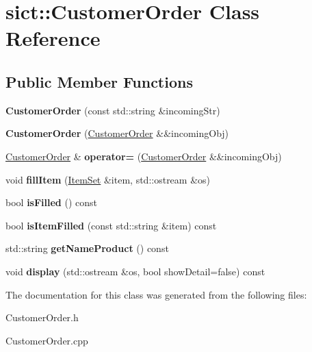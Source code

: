 \hypertarget{classsict_1_1CustomerOrder}{}\section{sict\+::Customer\+Order Class Reference}
\label{classsict_1_1CustomerOrder}
\subsection*{Public Member Functions}
\begin{DoxyCompactItemize}
\item 
\mbox{\label{classsict_1_1CustomerOrder_a99059f4ad8017fc50cd7415399c19590}} 
{\bfseries Customer\+Order} (const std\+::string \&incoming\+Str)
\item 
\mbox{\label{classsict_1_1CustomerOrder_aec3ddf69effe4f1a0a3fceff70f15c68}} 
{\bfseries Customer\+Order} (\mbox{\hyperlink{classsict_1_1CustomerOrder}{Customer\+Order}} \&\&incoming\+Obj)
\item 
\mbox{\label{classsict_1_1CustomerOrder_a1502e66899c28b565610e8516985a27b}} 
\mbox{\hyperlink{classsict_1_1CustomerOrder}{Customer\+Order}} \& {\bfseries operator=} (\mbox{\hyperlink{classsict_1_1CustomerOrder}{Customer\+Order}} \&\&incoming\+Obj)
\item 
\mbox{\label{classsict_1_1CustomerOrder_a08ec1a2acdd124da489e2e9177349ffb}} 
void {\bfseries fill\+Item} (\mbox{\hyperlink{classsict_1_1ItemSet}{Item\+Set}} \&item, std\+::ostream \&os)
\item 
\mbox{\label{classsict_1_1CustomerOrder_a70160bacde7481aaeb51d1455429199f}} 
bool {\bfseries is\+Filled} () const
\item 
\mbox{\label{classsict_1_1CustomerOrder_a1f8f4fab0abe3139267fe75b1265f99d}} 
bool {\bfseries is\+Item\+Filled} (const std\+::string \&item) const
\item 
\mbox{\label{classsict_1_1CustomerOrder_a9476430dd30e84d937af5b433e7c6471}} 
std\+::string {\bfseries get\+Name\+Product} () const
\item 
\mbox{\label{classsict_1_1CustomerOrder_a76b1be8cf0608e0778460f5f58657d5a}} 
void {\bfseries display} (std\+::ostream \&os, bool show\+Detail=false) const
\end{DoxyCompactItemize}


The documentation for this class was generated from the following files\+:\begin{DoxyCompactItemize}
\item 
Customer\+Order.\+h\item 
Customer\+Order.\+cpp\end{DoxyCompactItemize}
